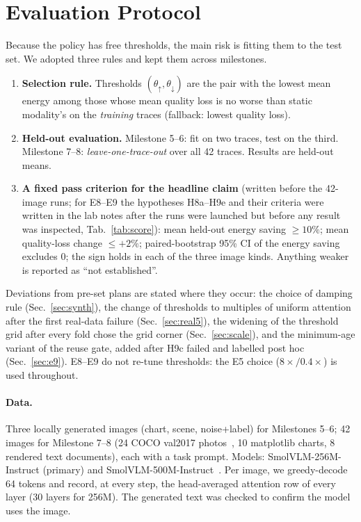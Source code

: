 \documentclass[10pt,a4paper]{article}
\begin{document}
\section{Evaluation Protocol}
\label{sec:protocol}
Because the policy has free thresholds, the main risk is fitting them to the test set. We adopted three rules and kept them across milestones.
\begin{enumerate}[leftmargin=1.3em]
\item \textbf{Selection rule.} Thresholds $(\theta_\uparrow,\theta_\downarrow)$ are the pair with the lowest mean energy among those whose mean quality loss is no worse than static modality's on the \emph{training} traces (fallback: lowest quality loss).
\item \textbf{Held-out evaluation.} Milestone 5--6: fit on two traces, test on the third. Milestone 7--8: \emph{leave-one-trace-out} over all 42 traces. Results are held-out means.
\item \textbf{A fixed pass criterion for the headline claim} (written before the 42-image runs; for E8--E9 the hypotheses H8a--H9e and their criteria were written in the lab notes after the runs were launched but before any result was inspected, Tab.~\ref{tab:score}): mean held-out energy saving $\ge 10\%$; mean quality-loss change $\le +2\%$; paired-bootstrap 95\% CI of the energy saving excludes 0; the sign holds in each of the three image kinds. Anything weaker is reported as ``not established''.
\end{enumerate}
Deviations from pre-set plans are stated where they occur: the choice of damping rule (Sec.~\ref{sec:synth}), the change of thresholds to multiples of uniform attention after the first real-data failure (Sec.~\ref{sec:real5}), the widening of the threshold grid after every fold chose the grid corner (Sec.~\ref{sec:scale}), and the minimum-age variant of the reuse gate, added after H9c failed and labelled post hoc (Sec.~\ref{sec:e9}). E8--E9 do not re-tune thresholds: the E5 choice ($8\times/0.4\times$) is used throughout.

\paragraph{Data.} Three locally generated images (chart, scene, noise+label) for Milestones 5--6; 42 images for Milestone 7--8 (24 COCO val2017 photos~\cite{coco}, 10 matplotlib charts, 8 rendered text documents), each with a task prompt. Models: SmolVLM-256M-Instruct (primary) and SmolVLM-500M-Instruct~\cite{smolvlm}. Per image, we greedy-decode 64 tokens and record, at every step, the head-averaged attention row of every layer (30 layers for 256M). The generated text was checked to confirm the model uses the image.
\end{document}
